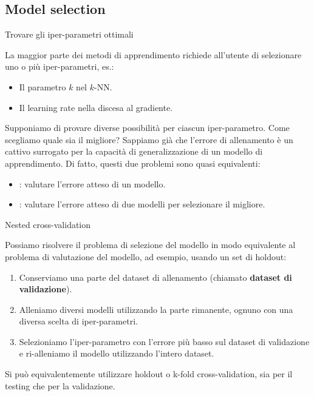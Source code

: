 \documentclass[12pt,aspectratio=169]{beamer}
\begin{document}
\subsection{Model selection}

\begin{frame}{Trovare gli iper-parametri ottimali}
	
	La maggior parte dei metodi di apprendimento richiede all'utente di selezionare uno o più iper-parametri, es.:
	\begin{itemize}
		\item Il parametro $k$ nel $k$-NN.
		\item Il learning rate nella discesa al gradiente.
	\end{itemize}
	
	Supponiamo di provare diverse possibilità per ciascun iper-parametro. Come scegliamo quale sia il migliore? Sappiamo già che l'errore di allenamento è un cattivo surrogato per la capacità di generalizzazione di un modello di apprendimento. Di fatto, questi due problemi sono quasi equivalenti:
	\begin{itemize}
		\item {}: valutare l'errore atteso di un modello.
		\item {}: valutare l'errore atteso di due modelli per selezionare il migliore.
	\end{itemize}
	
\end{frame}

\begin{frame}{Nested cross-validation}
	
	Possiamo risolvere il problema di selezione del modello in modo equivalente al problema di valutazione del modello, ad esempio, usando un set di holdout:
	\begin{enumerate}
		\item Conserviamo una parte del dataset di allenamento (chiamato \textbf{dataset di validazione}).
		\item Alleniamo diversi modelli utilizzando la parte rimanente, ognuno con una diversa scelta di iper-parametri.
		\item Selezioniamo l'iper-parametro con l'errore più basso sul dataset di validazione e ri-alleniamo il modello utilizzando l'intero dataset.
	\end{enumerate}
	
	Si può equivalentemente utilizzare holdout o k-fold cross-validation, sia per il testing che per la validazione.
	
\end{frame}
\end{document}
